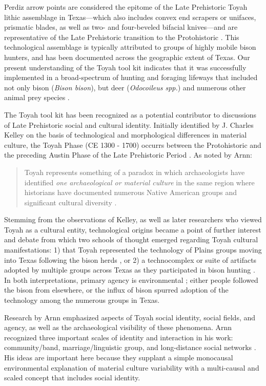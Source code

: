 \documentclass[smallextended]{svjour3}       %
\begin{document}
Perdiz arrow points are considered the epitome of the Late Prehistoric
Toyah lithic assemblage in Texas---which also includes convex end
scrapers or unifaces, prismatic blades, as well as two- and four-beveled
bifacial knives---and are representative of the Late Prehistoric
transition to the Protohistoric \cite{RN9718}. This technological
assemblage is typically attributed to groups of highly mobile bison
hunters, and has been documented across the geographic extent of Texas.
Our present understanding of the Toyah tool kit indicates that it was
successfully implemented in a broad-spectrum of hunting and foraging
lifeways that included not only bison (\emph{Bison bison}), but deer
(\emph{Odocoileus spp.}) and numerous other animal prey species
\cite{RN9718,RN9786}.

The Toyah tool kit has been recognized as a potential contributor to
discussions of Late Prehistoric social and cultural identity. Initially
identified by J. Charles Kelley on the basis of technological and
morphological differences in material culture, the Toyah Phase (CE 1300
- 1700) occurrs between the Protohistoric and the preceding Austin Phase
of the Late Prehistoric Period \cite{RN9719,RN9720}. As noted by Arnn:

\begin{quote}
Toyah represents something of a paradox in which archaeologists have
identified \emph{one archaeological or material culture} in the same
region where historians have documented numerous Native American groups
and significant cultural diversity \cite[47]{RN9718}.
\end{quote}

Stemming from the observations of Kelley, as well as later researchers
who viewed Toyah as a cultural entity, technological origins became a
point of further interest and debate from which two schools of thought
emerged regarding Toyah cultural manifestations: 1) that Toyah
represented the technology of Plains groups moving into Texas following
the bison herds \cite{RN9721,RN9722}, or 2) a technocomplex or suite of
artifacts adopted by multiple groups across Texas as they participated
in bison hunting \cite{RN9008,RN9723,RN9724}. In both interpretations,
primary agency is environmental \cite{RN9718}; either people followed
the bison from elsewhere, or the influx of bison spurred adoption of the
technology among the numerous groups in Texas.

Research by Arnn \cite{RN9718,RN9716,RN5784,RN9717} emphasized aspects
of Toyah social identity, social fields, and agency, as well as the
archaeological visibility of these phenomena. Arnn recognized three
important scales of identity and interaction in his work:
community/band, marriage/linguistic group, and long-distance social
networks \cite{RN9718}. His ideas are important here because they
supplant a simple monocausal environmental explanation of material
culture variability with a multi-causal and scaled concept that includes
social identity.
\end{document}
